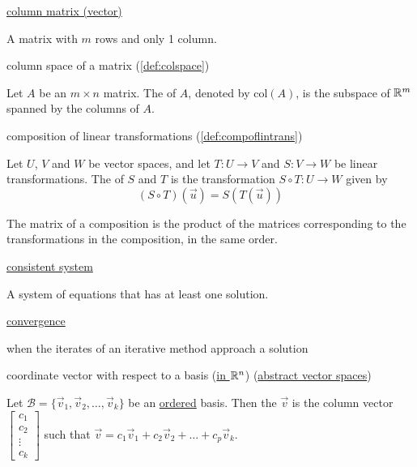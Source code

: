 \documentclass{ximera}
\begin{document}
\href{https://ximera.osu.edu/oerlinalg/LinearAlgebra/MAT-0010/main}{column matrix (vector)}
\begin{expandable}
    A matrix with $m$ rows and only 1 column.
\end{expandable}

column space of a matrix (\ref{def:colspace})
\begin{expandable}
    Let $A$ be an $m\times n$ matrix.  The  of $A$, denoted by $\mbox{col}(A)$, is the subspace of $\mathbb{R}^m$ spanned by the columns of $A$.
\end{expandable}

composition of linear transformations (\ref{def:compoflintrans})
\begin{expandable}
    Let $U$, $V$ and $W$ be vector spaces, and let $T:U\rightarrow V$ and $S:V\rightarrow W$ be linear transformations.  The  of $S$ and $T$ is the transformation $S\circ T:U\rightarrow W$ given by
$$(S\circ T)(\vec{u})=S(T(\vec{u}))$$

The matrix of a composition is the product of the matrices corresponding to the transformations in the composition, in the same order.
\end{expandable}

\href{https://ximera.osu.edu/oerlinalg/LinearAlgebra/SYS-0010/main}{consistent system}
\begin{expandable}
    A system of equations that has at least one solution.
\end{expandable}

\href{https://ximera.osu.edu/oerlinalg/LinearAlgebra/SYS-0040/main}{convergence}
\begin{expandable}
    when the iterates of an iterative method approach a solution
\end{expandable}

coordinate vector with respect to a basis (\href{https://ximera.osu.edu/oerlinalg/LinearAlgebra/VSP-0030/main}{in $\mathbb{R}^n$}) (\href{https://ximera.osu.edu/oerlinalg/LinearAlgebra/VSP-0060/main}{abstract vector spaces})
\begin{expandable}
    Let $\mathcal{B} = \{\vec{v}_1, \vec{v}_2,\ldots ,\vec{v}_k\}$ be an \underline{ordered} basis.  Then the  $\vec{v}$ is the  column vector $\begin{bmatrix}c_1\\ c_2\\ \vdots \\c_k\end{bmatrix}$ such that $\vec{v} = c_1\vec{v}_1+c_2\vec{v}_2+\ldots +c_p\vec{v}_k$.
\end{expandable}
\end{document}
